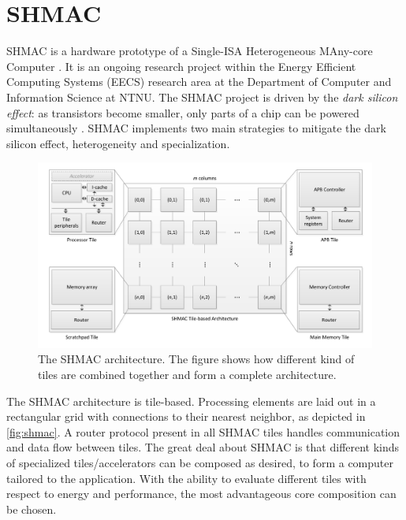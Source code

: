 \section{SHMAC}

SHMAC is a hardware prototype of a Single-ISA Heterogeneous MAny-core Computer
\cite{shmacsliedes, shmacwebpage, Rusten567042}. It is an ongoing research
project within the Energy Efficient Computing Systems (EECS) research area at
the Department of Computer and Information Science at NTNU. The SHMAC project is
driven by the \textit{dark silicon effect}: as transistors become smaller, only
parts of a chip can be powered simultaneously \cite{esmaeilzadeh2011dark}.
SHMAC implements two main strategies to mitigate the dark silicon effect,
heterogeneity and specialization.

\begin{figure}
    \centering
    \includegraphics[width=1.0\textwidth]{figs/shmac-high-level2.png}
    \caption{The SHMAC architecture. The figure shows how different kind of
    tiles are combined together and form a complete architecture.}
    \label{fig:shmac}
\end{figure}

The SHMAC architecture is tile-based. Processing elements are laid out in a
rectangular grid with connections to their nearest neighbor, as depicted in
\autoref{fig:shmac}. A router protocol present in all SHMAC tiles handles
communication and data flow between tiles. The great deal about SHMAC is that
different kinds of specialized tiles/accelerators can be composed as desired, to
form a computer tailored to the application. With the ability to evaluate
different tiles with respect to energy and performance, the most advantageous
core composition can be chosen.
